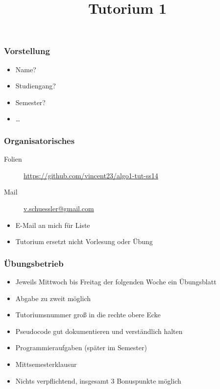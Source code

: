 
\title[Algorithmen I SS 14]{Tutorium 1}




\begin{frame}
  \maketitle
\end{frame}

\begin{frame}
	\frametitle{Vorstellung}
	\begin{itemize}
		\item Name?
		\item Studiengang?
		\item Semester?
		\item …
	\end{itemize}
\end{frame}

\begin{frame}
	\frametitle{Organisatorisches}
	\begin{description}
		\item[Folien] \url{https://github.com/vincent23/algo1-tut-ss14}
		\item[Mail] \href{mailto:v.schuessler@gmail.com}{v.schuessler@gmail.com}
	\end{description}

	\begin{itemize}
		\item E-Mail an mich für Liste
		\item Tutorium ersetzt nicht Vorlesung oder Übung
	\end{itemize}
\end{frame}

\begin{frame}
	\frametitle{Übungsbetrieb}
	\begin{itemize}
		\item Jeweils Mittwoch bis Freitag der folgenden Woche ein Übungsblatt
		\item Abgabe zu zweit möglich
		\item Tutoriumsnummer groß in die rechte obere Ecke
		\item Pseudocode gut dokumentieren und verständlich halten
		\item Programmieraufgaben (später im Semester)
		\item Mittsemesterklausur
		\item Nichts verpflichtend, insgesamt 3 Bonuspunkte möglich
	\end{itemize}
\end{frame}


